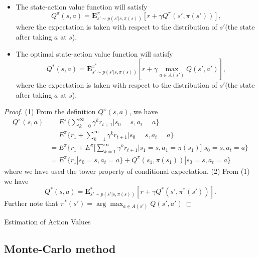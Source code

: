 \begin{refsection}
\begin{lemma}\hfill
\begin{itemize}
	\item The state-action value function will satisfy
	$$Q^\pi(s,a) = \mathbf{E}^\pi_{s'\sim p(s'|s,\pi(s))} [r + \gamma Q^\pi(s',\pi(s'))],$$
where the expectation is taken with respect to the distribution of $s'$(the state after taking $a$ at $s$).	
	\item The optimal state-action value function will satisfy
	$$Q^*(s,a) = \mathbf{E}^{\pi^*}_{s'\sim p(s'|s,\pi(s))}[r + \gamma \max_{a\in A(s')} Q(s',a')],$$
	where the expectation is taken with respect to the distribution of $s'$(the state after taking $a$ at $s$). 
\end{itemize}
\end{lemma}
\begin{proof}
(1)
From the definition $Q^\pi(s, a)$, we have
\begin{align*}
Q^\pi(s,a) &= E^\pi \{\sum_{k=0}^\infty \gamma^k r_{t+1}|s_0 = s,a_t = a\} \\
		   &= E^\pi \{r_{1} + \sum_{k=1}^\infty \gamma^k r_{t+1}|s_0 = s,a_t = a\} \\
		   &= E^\pi \{r_{1} + E^{\pi}[\sum_{k=1}^\infty \gamma^k r_{t+1}|s_1 = s, a_1 = \pi(s_1)]|s_0 = s,a_t = a\} \\
		   &= E^\pi \{r_{1}|s_0 = s,a_t = a\} + Q^\pi(s_1,\pi(s_1))|s_0 = s,a_t = a\} 
\end{align*}
where we have used the tower property of conditional expectation.
(2)
From (1) we have
	$$Q^*(s,a) = \mathbf{E}^*_{s'\sim p(s'|s,\pi(s))} [r + \gamma Q^*(s',\pi^*(s'))].$$
Further note that $\pi^*(s') = \arg\max_{a\in A(s')} Q(s',a')$
\end{proof}



\begin{algorithm}
	
	\caption{Estimation of Action Values}
\end{algorithm}


\subsection{Monte-Carlo method}



\end{refsection}
